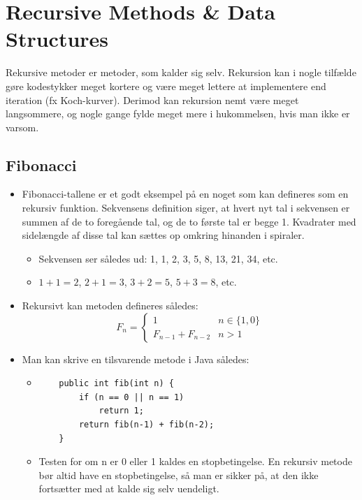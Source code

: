 \section{Recursive Methods \& Data Structures}

Rekursive metoder er metoder, som kalder sig selv. Rekursion kan i nogle tilfælde gøre kodestykker meget kortere og være meget lettere at implementere end iteration (fx Koch-kurver). Derimod kan rekursion nemt være meget langsommere, og nogle gange fylde meget mere i hukommelsen, hvis man ikke er varsom.

\subsection{Fibonacci}

\begin{itemize}
  \item Fibonacci-tallene er et godt eksempel på en noget som kan defineres som en rekursiv funktion. Sekvensens definition siger, at hvert nyt tal i sekvensen er summen af de to foregående tal, og de to første tal er begge 1. Kvadrater med sidelængde af disse tal kan sættes op omkring hinanden i spiraler. 
  \begin{itemize}
    \item Sekvensen ser således ud: 1, 1, 2, 3, 5, 8, 13, 21, 34, etc.
    \item $1+1=2$, $2+1=3$, $3+2=5$, $5+3=8$, etc.
  \end{itemize}

  \item Rekursivt kan metoden defineres således:
  \[
    F_n =
    \begin{cases}
      1                 & n \in \{1,0\} \\
      F_{n-1} + F_{n-2} & n > 1
    \end{cases}
  \]
  \item Man kan skrive en tilsvarende metode i Java således:
  \begin{itemize}
    \item
      \begin{verbatim}
    public int fib(int n) {
        if (n == 0 || n == 1)
            return 1;
        return fib(n-1) + fib(n-2);
    }
      \end{verbatim}
    \item Testen for om n er 0 eller 1 kaldes en stopbetingelse. En rekursiv metode bør altid have en stopbetingelse, så man er sikker på, at den ikke fortsætter med at kalde sig selv uendeligt.
  \end{itemize}


\end{itemize}
